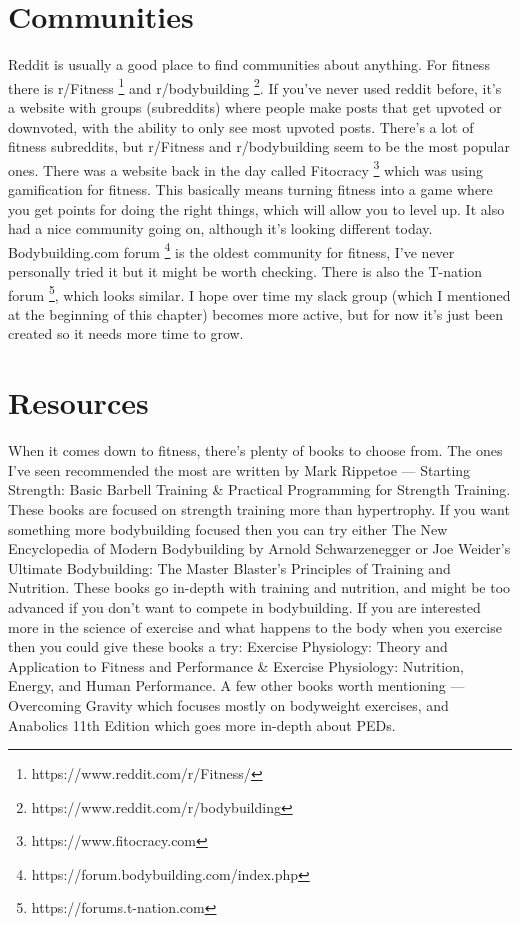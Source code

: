 \documentclass[openany, 12pt]{book}
\begin{document}
        \section{Communities}

        Reddit is usually a good place to find communities about anything. For fitness there is r/Fitness
        \footnote{https://www.reddit.com/r/Fitness/}
        and r/bodybuilding
        \footnote{https://www.reddit.com/r/bodybuilding}. If you've never used reddit before, it's a website with groups (subreddits) where people make
        posts that get upvoted or downvoted, with the ability to only see most upvoted posts. There's a lot of fitness subreddits, but r/Fitness and r/bodybuilding seem to be the most
        popular ones. There was a website back in the day called Fitocracy
        \footnote{https://www.fitocracy.com} which was using gamification for fitness. This basically means turning fitness into a game where you get points for
        doing the right things, which will allow you to level up. It also had a nice community going on, although it's looking different today. Bodybuilding.com forum
        \footnote{https://forum.bodybuilding.com/index.php} is the oldest community for fitness, I've never personally tried it but it might be worth checking.
        There is also the T-nation forum
        \footnote{https://forums.t-nation.com}, which looks similar. I hope over time my slack group (which I mentioned at the beginning of this chapter) 
        becomes more active, but for now it's just been created so it needs more time to grow.
        
        \section{Resources}

        When it comes down to fitness, there's plenty of books to choose from. The ones I've seen recommended the most are written by Mark Rippetoe --- Starting Strength: Basic Barbell Training
        \& Practical Programming for Strength Training. These books are focused on
        strength training more than hypertrophy. If you want something more bodybuilding focused then you can try either The New Encyclopedia of Modern Bodybuilding
        by Arnold Schwarzenegger or Joe Weider's Ultimate Bodybuilding: The Master Blaster's Principles of Training and Nutrition. These books go in-depth with training and nutrition, and
        might be too advanced if you don't want to compete in bodybuilding.
        If you are interested more in the science of exercise and what happens to the body when you exercise then you could give these
        books a try: Exercise Physiology: Theory and Application to Fitness and Performance
        \& Exercise Physiology: Nutrition, Energy, and Human Performance.
        A few other books worth mentioning --- Overcoming Gravity which focuses mostly on bodyweight exercises, and
        Anabolics 11th Edition which goes more in-depth about PEDs.
\end{document}
